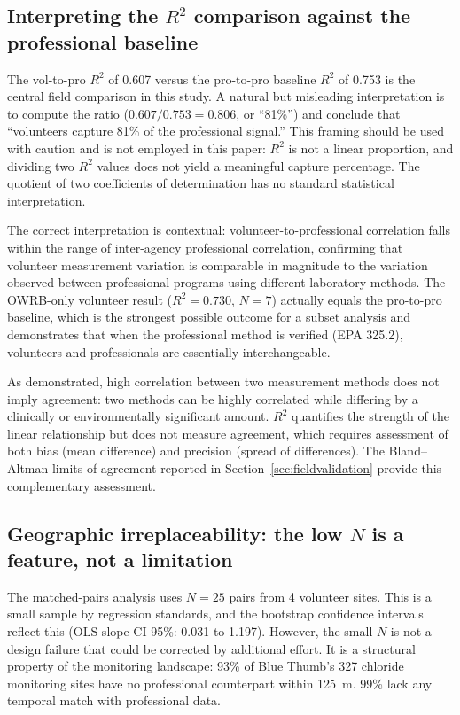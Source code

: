 \documentclass[lineno]{wlpeerj}
\begin{document}
\subsection{Interpreting the $R^{2}$ comparison against the professional baseline}

The vol-to-pro $R^{2}$ of 0.607 versus the pro-to-pro baseline $R^{2}$ of 0.753 is the central field comparison in this study. A natural but misleading interpretation is to compute the ratio ($0.607 / 0.753 = 0.806$, or ``81\%'') and conclude that ``volunteers capture 81\% of the professional signal.'' This framing should be used with caution and is not employed in this paper: $R^{2}$ is not a linear proportion, and dividing two $R^{2}$ values does not yield a meaningful capture percentage. The quotient of two coefficients of determination has no standard statistical interpretation.

The correct interpretation is contextual: volunteer-to-professional correlation falls within the range of inter-agency professional correlation, confirming that volunteer measurement variation is comparable in magnitude to the variation observed between professional programs using different laboratory methods. The OWRB-only volunteer result ($R^{2} = 0.730$, $N=7$) actually equals the pro-to-pro baseline, which is the strongest possible outcome for a subset analysis and demonstrates that when the professional method is verified (EPA 325.2), volunteers and professionals are essentially interchangeable.

As \citet{BlandAltman1986} demonstrated, high correlation between two measurement methods does not imply agreement: two methods can be highly correlated while differing by a clinically or environmentally significant amount. $R^{2}$ quantifies the strength of the linear relationship but does not measure agreement, which requires assessment of both bias (mean difference) and precision (spread of differences). The Bland--Altman limits of agreement reported in Section~\ref{sec:fieldvalidation} provide this complementary assessment.

\subsection{Geographic irreplaceability: the low $N$ is a feature, not a limitation}

The matched-pairs analysis uses $N=25$ pairs from 4 volunteer sites. This is a small sample by regression standards, and the bootstrap confidence intervals reflect this (OLS slope CI 95\%: 0.031 to 1.197). However, the small $N$ is not a design failure that could be corrected by additional effort. It is a structural property of the monitoring landscape: 93\% of Blue Thumb's 327 chloride monitoring sites have no professional counterpart within 125~m. 99\% lack any temporal match with professional data.
\end{document}
